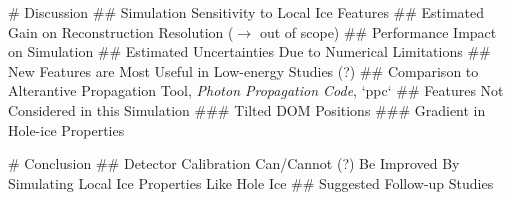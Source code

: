 # Discussion
## Simulation Sensitivity to Local Ice Features
## Estimated Gain on Reconstruction Resolution ($\rightarrow$ out of scope)
## Performance Impact on Simulation
## Estimated Uncertainties Due to Numerical Limitations
## New Features are Most Useful in Low-energy Studies (?)
## Comparison to Alterantive Propagation Tool, \textit{Photon Propagation Code}, `ppc`
## Features Not Considered in this Simulation
### Tilted DOM Positions
### Gradient in Hole-ice Properties

# Conclusion
## Detector Calibration Can/Cannot (?) Be Improved By Simulating Local Ice Properties Like Hole Ice
## Suggested Follow-up Studies


